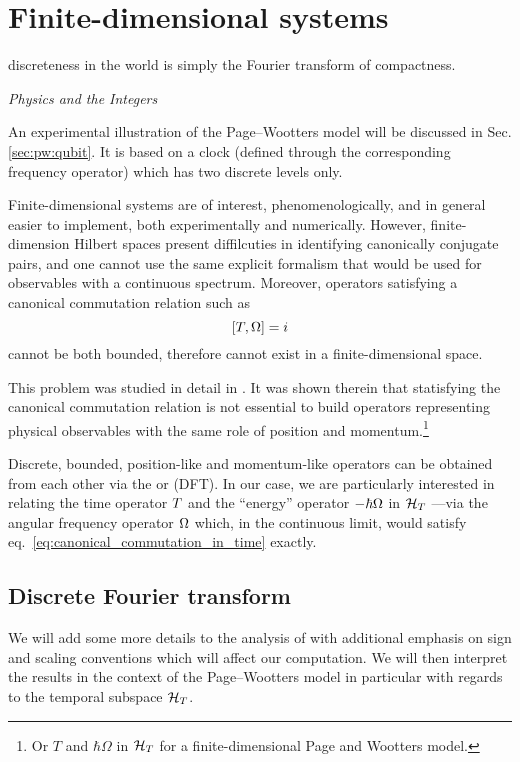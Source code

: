 \section{Finite-dimensional systems}\label{sec:finite-quantum}\label{sec:pw:theory_last}
\epigraph{\textelp{} discreteness in the world is simply the Fourier transform of compactness.}{%
  \emph{Physics and the Integers} \parencite{Tong_Integers}%
}

\noindent
An experimental illustration of the Page--Wootters model will be discussed in Sec. \ref{sec:pw:qubit}.
It is based on a clock
(defined through the corresponding frequency operator)
which has two discrete levels only.

Finite-dimensional systems are of interest, phenomenologically,
and in general easier to implement,
both experimentally and numerically.
However,
finite-dimension Hilbert spaces
present diffilcuties in identifying canonically conjugate
pairs, and one cannot use the same explicit formalism
that would be used for observables with a continuous spectrum.
Moreover, operators satisfying a canonical
commutation relation such as
\begin{equation}\label{eq:canonical_commutation_in_time}
  [{T}, {\Omega}] = i
\end{equation}
cannot be both bounded, therefore cannot exist in a finite-dimensional space.

This problem was studied in detail in
\cite{FiniteHilb}. It was shown therein
that statisfying the canonical commutation relation 
is not essential to build operators representing physical observables
with the same role of position and momentum.\footnote{
  Or $T$ and $\hbar\Omega$
  in $\mathcal{H}_T$ for a finite-dimensional Page and Wootters model.
}

Discrete, bounded, position-like and momentum-like operators can be obtained from
each other via
the  or   (DFT).
In our case, we are particularly interested in relating the
time operator ${T}$ and the ``energy'' operator $-\hbar{\Omega}$
in $\mathcal{H}_T$ ---via the angular frequency operator ${\Omega}$ which, in the continuous limit, would satisfy
eq.~\eqref{eq:canonical_commutation_in_time} exactly.

\subsection{Discrete Fourier transform}

We will add some more details to the analysis of \citereset\cite{FiniteHilb} with
additional emphasis on sign and scaling conventions which will affect
our computation. We will then interpret the results in the context of
the Page--Wootters model in particular with regards to the temporal subspace
$\mathcal{H}_T$.


